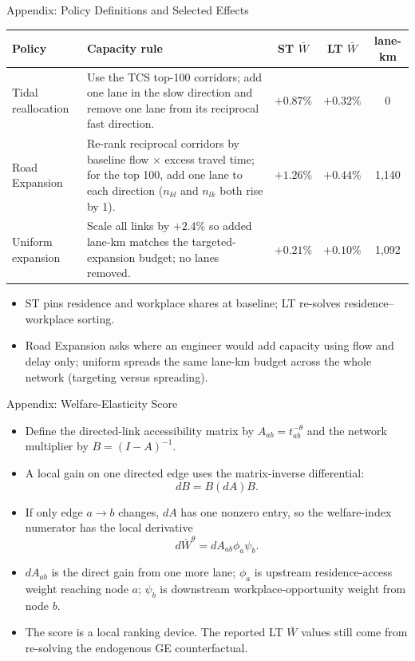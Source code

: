 \documentclass[11pt,aspectratio=169]{beamer}
\newcommand{\navback}[1]{\par\vspace{0.35em}\noindent\hfill\hyperlink{#1}{\beamerreturnbutton{back}}}
\begin{document}
\begin{frame}[label=apppolicy]{Appendix: Policy Definitions and Selected Effects}
\scriptsize
\begin{center}
\begin{tabular}{p{}p{}ccc}
\toprule
Policy & Capacity rule & ST $\bar W$ & LT $\bar W$ & lane-km \\
\midrule
Tidal reallocation & Use the TCS top-100 corridors; add one lane in the slow direction and remove one lane from its reciprocal fast direction. & $+0.87\%$ & $+0.32\%$ & 0 \\
Road Expansion & Re-rank reciprocal corridors by baseline flow $\times$ excess travel time; for the top 100, add one lane to each direction ($n_{kl}$ and $n_{lk}$ both rise by 1). & $+1.26\%$ & $+0.44\%$ & 1{,}140 \\
Uniform expansion & Scale all links by $+2.4\%$ so added lane-km matches the targeted-expansion budget; no lanes removed. & $+0.21\%$ & $+0.10\%$ & 1{,}092 \\
\bottomrule
\end{tabular}
\end{center}
\vspace{0.2em}
\begin{itemize}\footnotesize
  \item ST pins residence and workplace shares at baseline; LT re-solves residence--workplace sorting.
  \item Road Expansion asks where an engineer would add capacity using flow and delay only; uniform spreads the same lane-km budget across the whole network (targeting versus spreading).
\end{itemize}
\navback{result4}
\end{frame}

\begin{frame}[label=appelast]{Appendix: Welfare-Elasticity Score}
\scriptsize
\begin{itemize}
  \item Define the directed-link accessibility matrix by $A_{ab}=t_{ab}^{-\theta}$ and the network multiplier by $B=(I-A)^{-1}$.
  \item A local gain on one directed edge uses the matrix-inverse differential:
  \[
    dB=B(dA)B.
  \]
  \item If only edge $a\to b$ changes, $dA$ has one nonzero entry, so the welfare-index numerator has the local derivative
  \[
    d\bar W^\theta=dA_{ab}\phi_a\psi_b.
  \]
  \item $dA_{ab}$ is the direct gain from one more lane; $\phi_a$ is upstream residence-access weight reaching node $a$; $\psi_b$ is downstream workplace-opportunity weight from node $b$.
  \item The score is a local ranking device. The reported LT $\bar W$ values still come from re-solving the endogenous GE counterfactual.
\end{itemize}
\navback{resultelast}
\end{frame}
\end{document}
